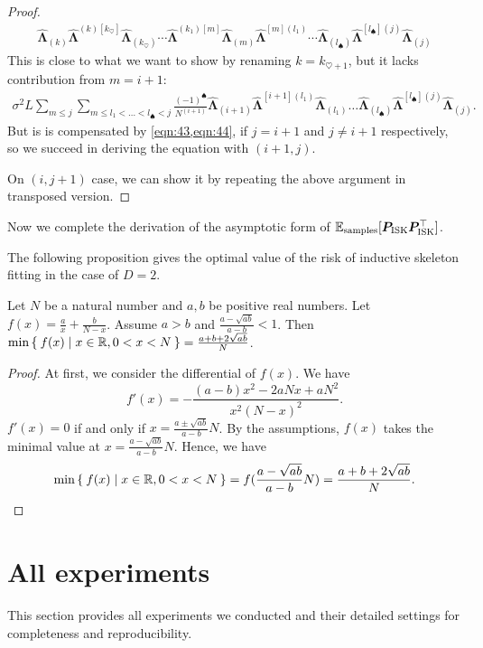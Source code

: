 \documentclass{article}
\begin{document}
\begin{proof}
\begin{align}
\hat{\bm \Lambda}_{(k)}
\hat{\bm \Lambda}^{(k)[k_{\heartsuit}]}
\hat{\bm \Lambda}_{(k_{\heartsuit} )}
\cdots
\hat{\bm \Lambda}^{(k_1)[m]}
\hat{\bm \Lambda}_{(m)}
\hat{\bm \Lambda}^{[m](l_1)}
\cdots
\hat{\bm \Lambda}_{(l_{\spadesuit} )}
\hat{\bm \Lambda}^{[l_{\spadesuit}](j)}
\hat{\bm \Lambda}_{(j)}
\end{align}
This is close to what we want to show by renaming $k = k_{\heartsuit + 1}$, but it lacks contribution from $m = i+1$:
\begin{align}
\sigma^2 L
\sum_{m \leq j}
\sum_{m \leq l_1 < \dots < l_\spadesuit <j }
\frac{(-1)^{\spadesuit}}{N^{(i+1)}}
\hat{\bm \Lambda}_{(i+1)}
\hat{\bm \Lambda}^{[i+1](l_1)}
\hat{\bm \Lambda}_{(l_1)}
\dots
\hat{\bm \Lambda}_{(l_\spadesuit)}
\hat{\bm \Lambda}^{[l_\spadesuit](j)}
\hat{\bm \Lambda}_{(j)}
.
\end{align}
But is is compensated by \cref{eqn:43,eqn:44}, if $j=i+1$ and $j \neq i+1$ respectively, so we succeed in deriving the equation with $(i+1, j)$.

On $(i, j+1)$ case, we can show it by repeating the above argument in transposed version.
\end{proof}
Now we complete the derivation of the asymptotic form of $\mathbb{E}_\text{samples}[\bm P_\text{ISK} \bm P_\text{ISK}^\top]$.




The following proposition gives the optimal value of the risk of inductive skeleton fitting in the case of $D=2$.
\begin{prop}
Let $N$ be a natural number and $a, b$ be positive real numbers.
Let $f(x) = \frac{a}{x} + \frac{b}{N - x}$.
Assume $a > b$ and $\frac{a - \sqrt{ab}}{a - b} < 1$.
Then $\min \Set{f(x) | x \in \mathbb{R}, 0 < x < N} = \frac{a + b + 2 \sqrt{ab}}{N}$.
\end{prop}

\begin{proof}
At first, we consider the differential of $f(x)$.
We have
\[
    f'(x) = -\frac{(a - b) x^2 - 2aNx + aN^2}{x^2 (N - x)^2}.
\]
$f'(x) = 0$ if and only if $x = \frac{a \pm \sqrt{ab}}{a - b}N$.
By the assumptions, $f(x)$ takes the minimal value at $x = \frac{a - \sqrt{ab}}{a - b}N$.
Hence, we have
\[
    \min \Set{f(x) | x \in \mathbb{R}, 0 < x < N} = f(\frac{a - \sqrt{ab}}{a - b} N) = \frac{a + b + 2 \sqrt{ab}}{N}.
\]
\end{proof}


\section{All experiments}\label{sec:numerical-experiments}
This section provides all experiments we conducted and their detailed settings for completeness and reproducibility.
\end{document}
